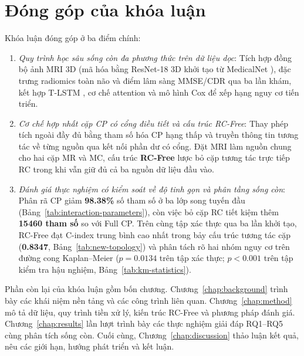\FloatBarrier
{}
\section{Đóng góp của khóa luận}
Khóa luận đóng góp ở ba điểm chính:
\begin{enumerate}
\item \emph{Quy trình học sâu sống còn đa phương thức trên dữ liệu dọc}: Tích hợp đồng bộ ảnh MRI 3D (mã hóa bằng ResNet-18 3D khởi tạo từ MedicalNet \cite{chen2019med3d}), đặc trưng radiomics toàn não và điểm lâm sàng MMSE/CDR qua ba lần khám, kết hợp T-LSTM \cite{baytas2017patient}, cơ chế attention và mô hình Cox để xếp hạng nguy cơ tiến triển.
\item \emph{Cơ chế hợp nhất cặp CP có cổng điều tiết và cấu trúc RC-Free}: Thay phép tích ngoài đầy đủ bằng tham số hóa CP hạng thấp và truyền thông tin tương tác về từng nguồn qua kết nối phần dư có cổng. Đặt MRI làm nguồn chung cho hai cặp MR và MC, cấu trúc \textbf{RC-Free} lược bỏ cặp tương tác trực tiếp RC trong khi vẫn giữ đủ cả ba nguồn dữ liệu đầu vào.
\item \emph{Đánh giá thực nghiệm có kiểm soát về độ tinh gọn và phân tầng sống còn}: Phân rã CP giảm \textbf{98.38\%} số tham số ở ba lớp song tuyến đầu (Bảng~\ref{tab:interaction-parameters}), còn việc bỏ cặp RC tiết kiệm thêm \textbf{15460 tham số} so với Full CP. Trên cùng tập xác thực qua ba lần khởi tạo, RC-Free đạt C-index trung bình cao nhất trong bảy cấu trúc tương tác cặp (\textbf{0.8347}, Bảng~\ref{tab:new-topology}) và phân tách rõ hai nhóm nguy cơ trên đường cong Kaplan--Meier ($p=0.0134$ trên tập xác thực; $p<0.001$ trên tập kiểm tra hậu nghiệm, Bảng~\ref{tab:km-statistics}).
\end{enumerate}

Phần còn lại của khóa luận gồm bốn chương. Chương~\ref{chap:background} trình bày các khái niệm nền tảng và các công trình liên quan. Chương~\ref{chap:method} mô tả dữ liệu, quy trình tiền xử lý, kiến trúc RC-Free và phương pháp đánh giá. Chương~\ref{chap:results} lần lượt trình bày các thực nghiệm giải đáp RQ1--RQ5 cùng phân tích sống còn. Cuối cùng, Chương~\ref{chap:discussion} thảo luận kết quả, nêu các giới hạn, hướng phát triển và kết luận.
